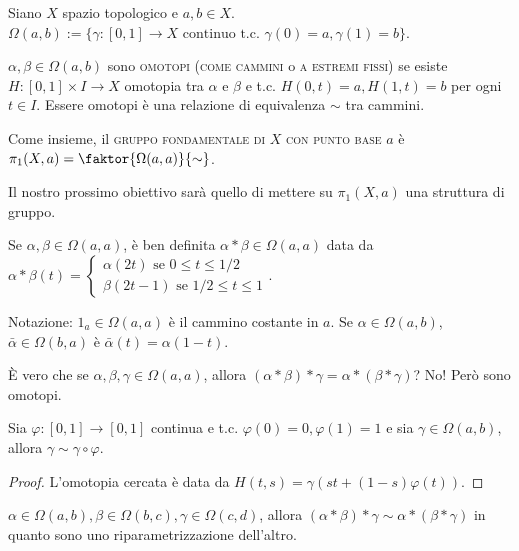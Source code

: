 Siano $X$ spazio topologico e $a, b \in X$. $\Omega(a, b):=\{\gamma:[0, 1] \rightarrow X \text{ continuo t.c. } \gamma(0)=a, \gamma(1)=b\}$.

\begin{defn}
  $\alpha, \beta \in \Omega(a, b)$ sono \textsc{omotopi} (\textsc{come cammini} o \textsc{a estremi fissi}) se esiste $H:[0, 1] \times I \rightarrow X$ omotopia tra $\alpha$ e $\beta$ e t.c. $H(0, t)=a, H(1, t)=b$ per ogni $t \in I$. Essere omotopi è una relazione di equivalenza $\sim$ tra cammini.
\end{defn}

\begin{defn}
  Come insieme, il \textsc{gruppo fondamentale di $X$ con punto base $a$} è $\pi_1(X, a)=\faktor{\Omega(a, a)}{\sim}$.
\end{defn}

Il nostro prossimo obiettivo sarà quello di mettere su $\pi_1(X, a)$ una struttura di gruppo.

Se $\alpha, \beta \in \Omega(a, a)$, è ben definita $\alpha * \beta \in \Omega(a, a)$ data da $\alpha * \beta (t)=\begin{cases} \alpha(2t) \text{ se } 0 \le t \le 1/2 \\
\beta(2t-1) \text{ se } 1/2 \le t \le 1 \end{cases}$.

Notazione: $1_a \in \Omega(a, a)$ è il cammino costante in $a$. Se $\alpha \in \Omega(a, b)$, $\bar{\alpha} \in \Omega(b, a)$ è $\bar{\alpha}(t)=\alpha(1-t)$.

È vero che se $\alpha, \beta, \gamma \in \Omega(a, a)$, allora $(\alpha * \beta) * \gamma=\alpha * (\beta * \gamma)$? No! Però sono omotopi. \marginpar{\warningsign}

\begin{lm}
  Sia $\varphi:[0, 1] \rightarrow [0, 1]$ continua e t.c. $\varphi(0)=0, \varphi(1)=1$ e sia $\gamma \in \Omega(a, b)$, allora $\gamma \sim \gamma \circ \varphi$.
\end{lm}

\begin{proof}
  L'omotopia cercata è data da $H(t, s)=\gamma(st+(1-s)\varphi(t))$.
\end{proof}

\begin{cor}
  $\alpha \in \Omega(a, b), \beta \in \Omega(b, c), \gamma \in \Omega(c, d)$, allora $(\alpha * \beta) * \gamma \sim \alpha * (\beta * \gamma)$ in quanto sono uno riparametrizzazione dell'altro.
\end{cor}

